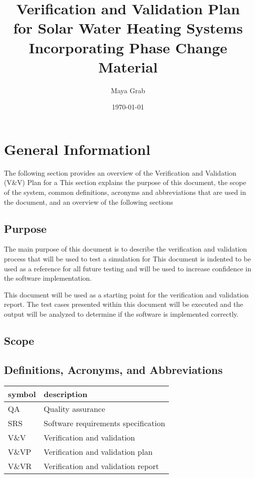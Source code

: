 \documentclass[12pt]{article}
\begin{document}
\title{Verification and Validation Plan for Solar Water Heating Systems Incorporating 
Phase Change Material} 
\author{Maya Grab}
\date{\today}
	
\maketitle

\tableofcontents

%
%

\section{General Informationl}
The following section provides an overview of the Verification and Validation (V\&V) Plan 
for a 
 This section explains the purpose of this document, the scope of the system,
  common definitions, acronyms and abbreviations that are used in the document,
   and an overview of the following sections

\subsection{Purpose}
The main purpose of this document is to describe the verification and validation 
process that will be used to test a simulation for 
This document is indented to be used as a reference for all future testing and will
be used to increase confidence in the software implementation.  

This document will be used as a starting point for the verification and validation report. The 
test cases presented within this document will be executed and the output will be analyzed to 
determine if the software is implemented correctly.  


\subsection{Scope}


\subsection{Definitions, Acronyms, and Abbreviations }

\renewcommand{\arraystretch}{1.2}
\begin{tabular}{l l} 
  \toprule		
  \textbf{symbol} & \textbf{description}\\
  \midrule 
  QA		&Quality assurance\\
  SRS		&Software requirements specification\\
  V\&V		& Verification and validation\\
  V\&VP 	& Verification and validation plan\\
  V\&VR 	& Verification and validation report\\

  \bottomrule
\end{tabular}\\
\end{document}
